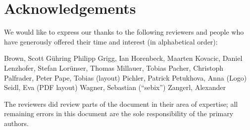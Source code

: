 \newpage
\section*{Acknowledgements}
\label{section:Reviewers}

We would like to express our thanks to the following reviewers and people who have generously offered their time and interest (in alphabetical order):

\begin{multicols}{2}{\parskip=0pt\centering\obeylines%
Brown, Scott
G\"uhring Philipp
Grigg, Ian
Horenbeck, Maarten
Kovacic, Daniel
Lenzhofer, Stefan
Lor\"unser, Thomas
Millauer, Tobias
Pacher, Christoph
Palfrader, Peter
Pape, Tobias (layout)
Pichler, Patrick
Petukhova, Anna (Logo)
Seidl, Eva (PDF layout)
Wagner, Sebastian (``sebix'')
Zangerl, Alexander
}\end{multicols}

The reviewers did review parts of the document in their area of
expertise; all remaining errors in this document are the sole
responsibility of the primary authors.




